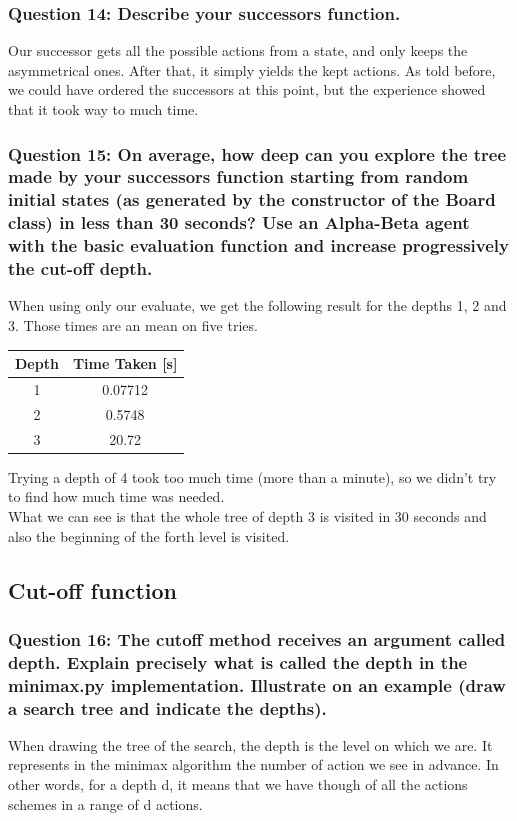 \documentclass[a4paper,10pt]{article}
\begin{document}
				\subsubsection{Question 14: Describe your successors function.}
					Our successor gets all the possible actions from a state, and only keeps the asymmetrical ones. After that, it simply yields the kept actions. As told before, we could have ordered the successors at this point, but the experience showed that it took way to much time.
				\subsubsection{Question 15: On average, how deep can you explore the tree made by your successors function starting from random initial states (as generated by the constructor of the Board class) in less than 30 seconds? Use an Alpha-Beta agent with the basic evaluation function and increase progressively the cut-off depth.}
					When using only our evaluate, we get the following result for the depths 1, 2 and 3. Those times are an mean on five tries.
					\begin{center}
						\begin{tabular}{|c|c|}
						\hline 
						Depth & Time Taken [s] \\ 
						\hline 
						1 & 0.07712 \\ 
						\hline 
						2 & 0.5748 \\ 
						\hline 
						3 & 20.72 \\ 
						\hline 
						\end{tabular} 
					\end{center}
					Trying a depth of 4 took too much time (more than a minute), so we didn't try to find how much time was needed.\\
					What we can see is that the whole tree of depth 3 is visited in 30 seconds and also the beginning of the forth level is visited.
				
			\subsection{Cut-off function}
				\subsubsection{Question 16: The cutoff method receives an argument called depth. Explain precisely what is called the depth in the minimax.py implementation. Illustrate on an example (draw a search tree and indicate the depths).}
					When drawing the tree of the search, the depth is the level on which we are. It represents in the minimax algorithm the number of action we see in advance. In other words, for a depth d, it means that we have though of all the actions schemes in a range of d actions.\\
\end{document}
